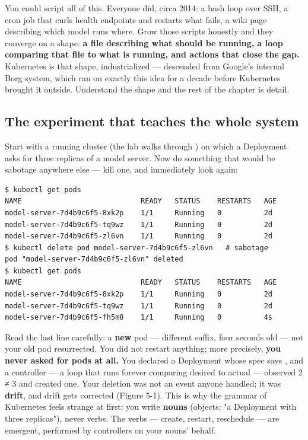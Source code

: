 You could script all of this. Everyone did, circa 2014: a bash loop over SSH, a cron job that curls health endpoints and restarts what fails, a wiki page describing which model runs where. Grow those scripts honestly and they converge on a shape: \textbf{a file describing what should be running, a loop comparing that file to what is running, and actions that close the gap.} Kubernetes is that shape, industrialized — descended from Google's internal Borg system, which ran on exactly this idea for a decade before Kubernetes brought it outside. Understand the shape and the rest of the chapter is detail.

\subsection*{The experiment that teaches the whole system}

Start with a running cluster (the lab walks through ) on which a Deployment asks for three replicas of a model server. Now do something that would be sabotage anywhere else — kill one, and immediately look again:

\begin{terminalbox}
\begin{Verbatim}[breaklines=true,breakanywhere=true,fontsize=\small,formatcom=\color{tbbtermfg},codes=\tbbcodeactive]
$ kubectl get pods
NAME                            READY   STATUS    RESTARTS   AGE
model-server-7d4b9c6f5-8xk2p    1/1     Running   0          2d
model-server-7d4b9c6f5-tq9wz    1/1     Running   0          2d
model-server-7d4b9c6f5-zl6vn    1/1     Running   0          2d
$ kubectl delete pod model-server-7d4b9c6f5-zl6vn   # sabotage
pod "model-server-7d4b9c6f5-zl6vn" deleted
$ kubectl get pods
NAME                            READY   STATUS    RESTARTS   AGE
model-server-7d4b9c6f5-8xk2p    1/1     Running   0          2d
model-server-7d4b9c6f5-tq9wz    1/1     Running   0          2d
model-server-7d4b9c6f5-fh5m8    1/1     Running   0          4s
\end{Verbatim}
\end{terminalbox}

Read the last line carefully: a \textbf{new} pod — different suffix, four seconds old — not your old pod resurrected. You did not restart anything; more precisely, \textbf{you never asked for pods at all.} You declared a Deployment whose spec says , and a controller — a loop that runs forever comparing desired to actual — observed 2 ≠ 3 and created one. Your deletion was not an event anyone handled; it was \textbf{drift}, and drift gets corrected (Figure 5-1). This is why the grammar of Kubernetes feels strange at first: you write \textbf{nouns} (objects: "a Deployment with three replicas"), never verbs. The verbs — create, restart, reschedule — are emergent, performed by controllers on your nouns' behalf.

